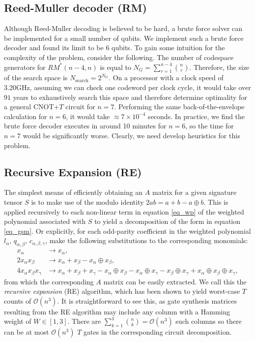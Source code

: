 \documentclass[notitlepage]{article}
\theoremstyle{definition}
\theoremstyle{problem}
\theoremstyle{lemma}
\begin{document}
\subsection{Reed-Muller decoder (RM)}
Although Reed-Muller decoding is believed to be hard, a brute force solver can be implemented for a small number of qubits. We implement such a brute force decoder and found its limit to be 6 qubits.
To gain some intuition for the complexity of the problem, consider the following. The number of codespace generators for $RM^*(n-4, n)$ is equal to $N_G = \sum_{r=1}^{n-4}{{n}\choose{r}}$.
Therefore, the size of the search space is $N_{\text{search}} = 2^{N_G}$. On a processor with a clock speed of 3.20GHz, assuming we can check one codeword per clock cycle, it would take over $91$ years to exhaustively search this space and therefore determine optimality for a general CNOT+$T$ circuit for $n=7$. Performing the same back-of-the-envelope calculation for $n=6$, it would take $\approx 7\times 10^{-4}$ seconds. In practice, we find the brute force decoder executes in around 10 minutes for $n=6$, so the time for $n=7$ would be significantly worse. Clearly, we need develop heuristics for this problem.

\subsection{Recursive Expansion (RE)}
The simplest means of efficiently obtaining an $A$ matrix for a given signature tensor $S$ is to make use of the modulo identity $2ab = a + b - a\oplus b$. This is applied recursively to each non-linear term in equation \ref{eq_wp} of the weighted polynomial  associated with $S$ to yield a decomposition of the form in equation \ref{eq_gsm}. Or explicitly, for each odd-parity coefficient in the weighted polynomial $l_\alpha$, $q_{\alpha,\beta}$, $c_{\alpha,\beta,\gamma}$, make the following substitutions to the corresponding monomials:
\begin{align}
x_\alpha &\rightarrow x_\alpha, \\
2x_\alpha x_\beta &\rightarrow x_\alpha + x_\beta - x_\alpha \oplus x_\beta, \\
4x_\alpha x_\beta x_\gamma &\rightarrow
x_\alpha + x_\beta  + x_\gamma - x_\alpha \oplus x_\beta - x_\alpha\oplus x_\gamma - x_\beta\oplus x_\gamma + x_\alpha \oplus x_\beta\oplus x_\gamma,
\end{align}
from which the corresponding $A$ matrix can be easily extracted.
We call this the \emph{recursive expansion} (RE) algorithm, which has been shown to yield worst-case $T$ counts of $\mathcal{O}(n^3)$. It is straightforward to see this, as gate synthesis matrices resulting from the RE algorithm may include any column with a Hamming weight of $W\in[1,3]$. There are $\sum_{k=1}^3{{n}\choose{k}}=\mathcal{O}(n^3)$ such columns so there can be at most $\mathcal{O}(n^3)$ $T$ gates in the corresponding circuit decomposition.
\end{document}
